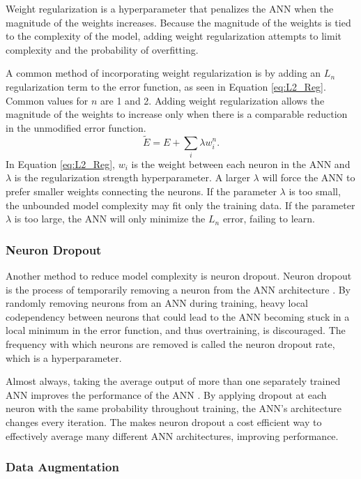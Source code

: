 Weight regularization is a hyperparameter that penalizes the ANN when the magnitude of the weights increases. Because the magnitude of the weights is tied to the complexity of the model, adding weight regularization attempts to limit complexity and the probability of overfitting.

A common method of incorporating weight regularization is by adding an $L_n$ regularization term to the error function, as seen in Equation \ref{eq:L2_Reg}. Common values for $n$ are 1 and 2. Adding weight regularization allows the magnitude of the weights to increase only when there is a comparable reduction in the unmodified error function.
%
\begin{equation} \label{eq:L2_Reg}
\tilde{E} = E + \sum_i \lambda w_i^n.
\end{equation}
%
In Equation \ref{eq:L2_Reg}, $w_i$ is the weight between each neuron in the ANN and $\lambda$ is the regularization strength hyperparameter. A larger $\lambda$ will force the ANN to prefer smaller weights connecting the neurons. If the parameter $\lambda$ is too small, the unbounded model complexity may fit only the training data. If the parameter $\lambda$ is too large, the ANN will only minimize the $L_n$ error, failing to learn.

\subsubsection{Neuron Dropout}

Another method to reduce model complexity is neuron dropout. Neuron dropout is the process of temporarily removing a neuron from the ANN architecture \cite{Srivastava2014}. By randomly removing neurons from an ANN during training, heavy local codependency between neurons that could lead to the ANN becoming stuck in a local minimum in the error function, and thus overtraining, is discouraged. The frequency with which neurons are removed is called the neuron dropout rate, which is a hyperparameter.

Almost always, taking the average output of more than one separately trained ANN improves the performance of the ANN \cite{Srivastava2014}. By applying dropout at each neuron with the same probability throughout training, the ANN's architecture changes every iteration. The makes neuron dropout a cost efficient way to effectively average many different ANN architectures, improving performance.

\subsubsection{Data Augmentation}

